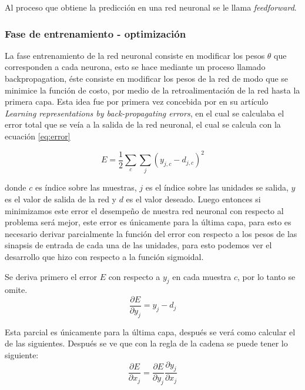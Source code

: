 \par Al proceso que obtiene la predicción en una red neuronal se le llama \textit{feedforward}.

\subsubsection{Fase de entrenamiento - optimización}

\par La fase entrenamiento de la red neuronal consiste en modificar los pesos $\theta$ que corresponden a cada neurona, esto se hace mediante un proceso llamado \gls{backpropagation}, éste consiste en modificar los pesos de la red de modo que se minimice la función de costo, por medio de la retroalimentación de la red hasta la primera capa. Esta idea fue por primera vez concebida por \cite{rumelhart1986learning} en su artículo \textit{Learning representations by back-propagating errors}, en el cual se calculaba el error total que se veía a la salida de la red neuronal, el cual se calcula con la ecuación \ref{eq:error}

\begin{equation}\label{eq:error}
	E=\frac{1}{2}\sum _{c}\sum _{j}( y_{j,c} -d_{j,c})^{2}
\end{equation}

donde $c$ es índice sobre las muestras, $j$ es el índice sobre las unidades se salida, $y$ es el valor de salida de la red y $d$ es el valor deseado. Luego entonces si minimizamos este error el desempeño de nuestra red neuronal con respecto al problema será mejor, este error es únicamente para la última capa, para esto es necesario derivar parcialmente la función del error con respecto a los pesos de las sinapsis de entrada de cada una de las unidades, para esto podemos ver el desarrollo que hizo \cite{rumelhart1986learning} con respecto a la función sigmoidal.

\par Se deriva primero el error $E$ con respecto a $y_{j}$ en cada muestra $c$, por lo tanto se omite.
\begin{equation}
	\frac{\partial E}{\partial y_{j}} =y_{j} -d_{j}
\end{equation}
\par Esta parcial es únicamente para la última capa, después se verá como calcular el de las siguientes. Después se ve que con la regla de la cadena se puede tener lo siguiente:
\begin{equation}
	\frac{\partial E}{\partial x_{j}} =\frac{\partial E}{\partial y_{j}}  \frac{\partial y_{j}}{\partial x_{j}}
\end{equation}

